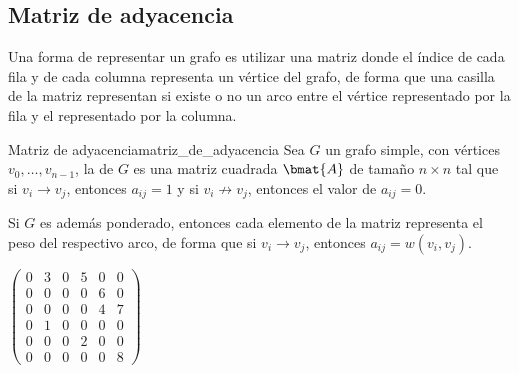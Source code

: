 
\subsection{Matriz de adyacencia}
\label{sec:matriz_de_adyacencia}

Una forma de representar un grafo es utilizar una matriz donde el índice de cada fila y de cada columna representa un vértice del grafo, de forma que una casilla de la matriz representan si existe o no un arco entre el vértice representado por la fila y el representado por la columna.

\begin{definicion}{Matriz de adyacencia}{matriz_de_adyacencia}
  Sea \(G\) un grafo simple, con vértices \(v_0, \ldots, v_{n-1}\), la  de \(G\) es una matriz cuadrada \(\bmat{A}\) de tamaño \(n\times n\) tal que si \(v_i \longrightarrow v_j\), entonces \(a_{ij} = 1\) y si \(v_i \not\longrightarrow v_j\), entonces el valor de \(a_{ij} = 0\).
\end{definicion}

Si \(G\) es además ponderado, entonces cada elemento de la matriz representa el peso del respectivo arco, de forma que si \(v_i \longrightarrow v_j\), entonces \(a_{ij} = w(v_i, v_j)\).

\begin{center}
  \hspace{1.5cm}
  \(
  \begin{pmatrix}
    0 & 3 & 0 & 5 & 0 & 0 \\
    0 & 0 & 0 & 0 & 6 & 0 \\
    0 & 0 & 0 & 0 & 4 & 7 \\
    0 & 1 & 0 & 0 & 0 & 0 \\
    0 & 0 & 0 & 2 & 0 & 0 \\
    0 & 0 & 0 & 0 & 0 & 8
  \end{pmatrix}
  \)
  \label{fig:matriz_de_adyacencia}
\end{center}


